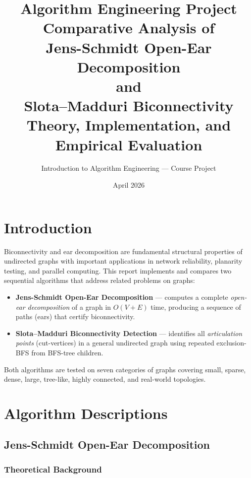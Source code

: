 \documentclass[12pt,a4paper]{article}
\title{%
    \Large\textbf{Algorithm Engineering Project}\\[0.6em]
    \large Comparative Analysis of\\[0.2em]
    \textbf{Jens-Schmidt Open-Ear Decomposition}\\
    and\\
    \textbf{Slota--Madduri Biconnectivity}\\[0.6em]
    \normalsize Theory, Implementation, and Empirical Evaluation
}
\author{Introduction to Algorithm Engineering --- Course Project}
\date{April 2026}
\begin{document}
\maketitle
\tableofcontents
\newpage

\section{Introduction}

Biconnectivity and ear decomposition are fundamental structural properties
of undirected graphs with important applications in network reliability,
planarity testing, and parallel computing.  This report implements and
compares two sequential algorithms that address related problems on graphs:

\begin{itemize}
    \item \textbf{Jens-Schmidt Open-Ear Decomposition} --- computes a
          complete \emph{open-ear decomposition} of a graph in $O(V+E)$
          time, producing a sequence of paths (ears) that certify
          biconnectivity.
    \item \textbf{Slota--Madduri Biconnectivity Detection} --- identifies
          all \emph{articulation points} (cut-vertices) in a general
          undirected graph using repeated exclusion-BFS from BFS-tree
          children.
\end{itemize}

Both algorithms are tested on seven categories of graphs covering small,
sparse, dense, large, tree-like, highly connected, and real-world topologies.


\section{Algorithm Descriptions}

\subsection{Jens-Schmidt Open-Ear Decomposition}

\subsubsection{Theoretical Background}
\end{document}
